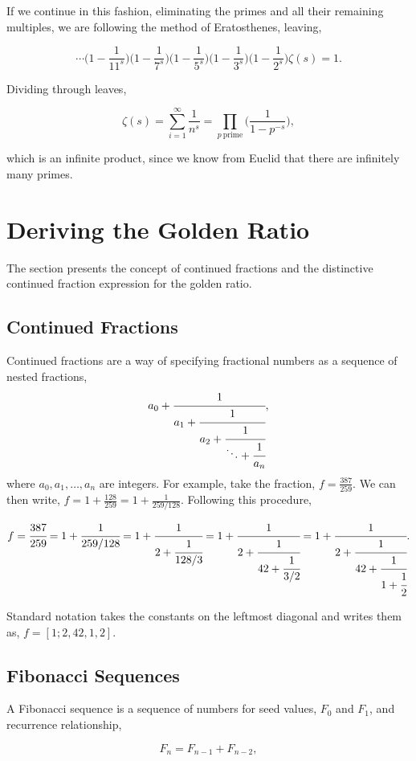 \documentclass[11pt]{amsart}
\begin{document}
If we continue in this fashion, eliminating the primes and all their remaining multiples, we are following the method of Eratosthenes, leaving,

$$
\cdots\Big(1 - \frac{1}{11^s}\Big)\Big(1 - \frac{1}{7^s}\Big)\Big(1 - \frac{1}{5^s}\Big)\Big(1 - \frac{1}{3^s}\Big)\Big(1 - \frac{1}{2^s}\Big)\zeta(s) = 1.
$$

Dividing through leaves,

$$\zeta(s) = \sum_{i=1}^{\infty}\frac{1}{n^s} = \prod_{p \ \text{prime}}\Bigg(\frac{1}{1 - p^{-s}}\Bigg),$$

which is an infinite product, since we know from Euclid that there are infinitely many primes.

\section{Deriving the Golden Ratio}

The section presents the concept of continued fractions and the distinctive continued fraction expression for the golden ratio.

\subsection{Continued Fractions}
Continued fractions are a way of specifying fractional numbers as a sequence of nested fractions,
$$a_0 + \cfrac{1}{a_1 + \cfrac{1}{a_2 + \cfrac{1}{\ddots + \cfrac{1}{a_n}}}},$$
where $a_0, a_1, \dots, a_n$ are integers. For example, take the fraction, $ f = \frac{387}{259}$. We can then write, $f = 1 + \frac{128}{259} = 1 + \frac{1}{259/128}$. Following this procedure,

$$
f = \cfrac{387}{259}
= 1 + \cfrac{1}{259/128}
= 1 + \cfrac{1}{2 + \cfrac{1}{128/3}} 
= 1 + \cfrac{1}{2 + \cfrac{1}{42 + \cfrac{1}{3/2}}} 
= 1 + \cfrac{1}{2 + \cfrac{1}{42 + \cfrac{1}{1 + \cfrac{1}{2}}}}.
$$

Standard notation takes the constants on the leftmost diagonal and writes them as, $f = [1; 2, 42, 1, 2]$.

\subsection{Fibonacci Sequences}

A Fibonacci sequence is a sequence of numbers for seed values, $F_0$ and $F_1$, and recurrence relationship,

$$F_n = F_{n-1} + F_{n-2},$$
\end{document}
